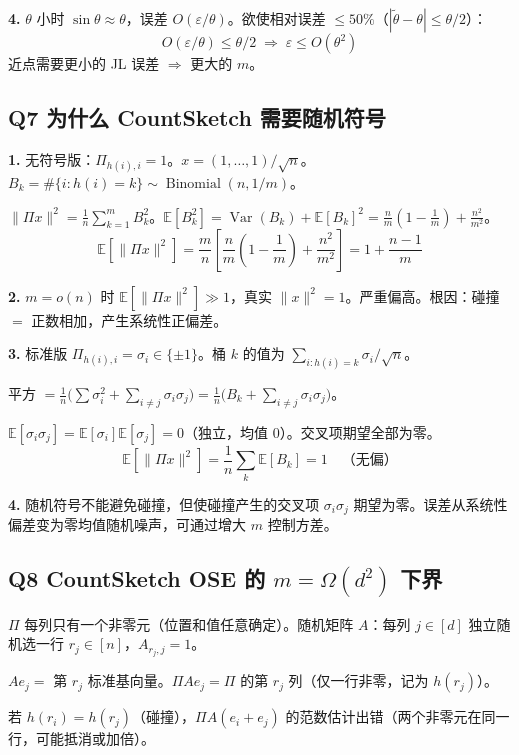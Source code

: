 \documentclass[11pt,a4paper]{ctexart}
\newcommand{\E}{\mathbb{E}}
\newcommand{\Var}{\operatorname{Var}}
\begin{document}
\textbf{4.} $\theta$ 小时 $\sin\theta \approx \theta$，误差 $O(\varepsilon/\theta)$。欲使相对误差 $\leq 50\%$（$|\tilde\theta-\theta| \leq \theta/2$）：
\[
O(\varepsilon/\theta) \leq \theta/2 \;\Rightarrow\; \boxed{\varepsilon \leq O(\theta^2)}
\]
近点需要更小的 JL 误差 $\Rightarrow$ 更大的 $m$。


\subsection*{Q7 \quad 为什么 CountSketch 需要随机符号}

\textbf{1.} 无符号版：$\Pi_{h(i),i}=1$。$x = (1,\dots,1)/\sqrt{n}$。$B_k = \#\{i:h(i)=k\} \sim \operatorname{Binomial}(n,1/m)$。

$\|\Pi x\|^2 = \frac{1}{n}\sum_{k=1}^m B_k^2$。$\E[B_k^2] = \Var(B_k) + \E[B_k]^2 = \frac{n}{m}(1-\frac{1}{m}) + \frac{n^2}{m^2}$。
\[
\E[\|\Pi x\|^2] = \frac{m}{n}\!\left[\frac{n}{m}\!\left(1-\frac{1}{m}\right) + \frac{n^2}{m^2}\right] = \boxed{1 + \frac{n-1}{m}}
\]

\textbf{2.} $m=o(n)$ 时 $\E[\|\Pi x\|^2] \gg 1$，真实 $\|x\|^2=1$。严重偏高。根因：碰撞 $=$ 正数相加，产生系统性正偏差。

\textbf{3.} 标准版 $\Pi_{h(i),i} = \sigma_i \in \{\pm 1\}$。桶 $k$ 的值为 $\sum_{i:h(i)=k} \sigma_i/\sqrt{n}$。

平方 $= \frac{1}{n}\big(\sum\sigma_i^2 + \sum_{i\neq j}\sigma_i\sigma_j\big) = \frac{1}{n}\big(B_k + \sum_{i\neq j}\sigma_i\sigma_j\big)$。

$\E[\sigma_i\sigma_j] = \E[\sigma_i]\E[\sigma_j] = 0$（独立，均值 $0$）。交叉项期望全部为零。
\[
\E[\|\Pi x\|^2] = \frac{1}{n}\sum_k \E[B_k] = 1 \quad\text{（无偏）}
\]

\textbf{4.} 随机符号不能避免碰撞，但使碰撞产生的交叉项 $\sigma_i\sigma_j$ 期望为零。误差从系统性偏差变为零均值随机噪声，可通过增大 $m$ 控制方差。


\subsection*{Q8 \quad CountSketch OSE 的 $m = \Omega(d^2)$ 下界}

$\Pi$ 每列只有一个非零元（位置和值任意确定）。随机矩阵 $A$：每列 $j\in[d]$ 独立随机选一行 $r_j\in[n]$，$A_{r_j,j}=1$。

$Ae_j =$ 第 $r_j$ 标准基向量。$\Pi A e_j = \Pi$ 的第 $r_j$ 列（仅一行非零，记为 $h(r_j)$）。

若 $h(r_i) = h(r_j)$（碰撞），$\Pi A(e_i+e_j)$ 的范数估计出错（两个非零元在同一行，可能抵消或加倍）。
\end{document}

